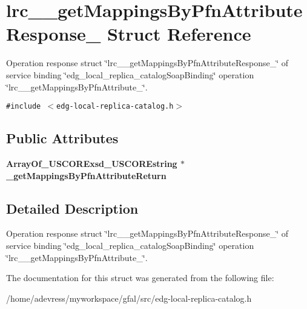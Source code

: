 \section{lrc\_\-\_\-get\-Mappings\-By\-Pfn\-Attribute\-Response\_\- Struct Reference}
\label{structlrc____getMappingsByPfnAttributeResponse__}
Operation response struct \char`\"{}lrc\_\-\_\-get\-Mappings\-By\-Pfn\-Attribute\-Response\_\-\char`\"{} of service binding \char`\"{}edg\_\-local\_\-replica\_\-catalog\-Soap\-Binding\char`\"{} operation \char`\"{}lrc\_\-\_\-get\-Mappings\-By\-Pfn\-Attribute\_\-\char`\"{}.  


{\tt \#include $<$edg-local-replica-catalog.h$>$}

\subsection*{Public Attributes}
\begin{CompactItemize}
\item 
\bf{Array\-Of\_\-USCORExsd\_\-USCOREstring} $\ast$ \textbf{\_\-get\-Mappings\-By\-Pfn\-Attribute\-Return}\label{structlrc____getMappingsByPfnAttributeResponse___7555c81f0cfb55a8835c4b3a66761d78}

\end{CompactItemize}


\subsection{Detailed Description}
Operation response struct \char`\"{}lrc\_\-\_\-get\-Mappings\-By\-Pfn\-Attribute\-Response\_\-\char`\"{} of service binding \char`\"{}edg\_\-local\_\-replica\_\-catalog\-Soap\-Binding\char`\"{} operation \char`\"{}lrc\_\-\_\-get\-Mappings\-By\-Pfn\-Attribute\_\-\char`\"{}. 



The documentation for this struct was generated from the following file:\begin{CompactItemize}
\item 
/home/adevress/myworkspace/gfal/src/edg-local-replica-catalog.h\end{CompactItemize}
